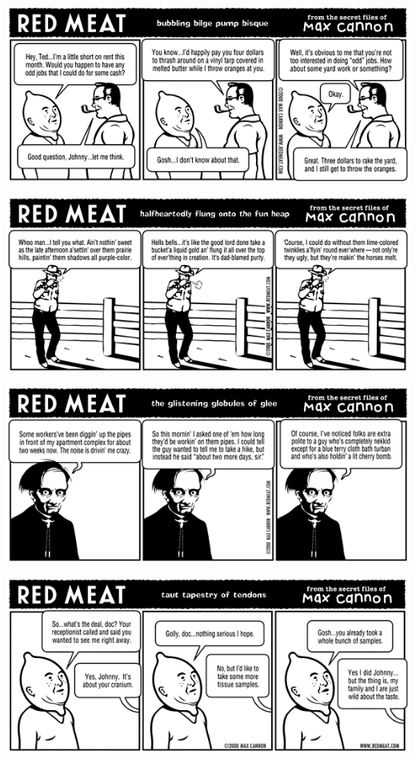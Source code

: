 \documentclass[a4paper,twoside,11pt]{article}
\begin{document}
\includegraphics[width=\textwidth]{redmeat_2000-03-14.png}



\includegraphics[width=\textwidth]{redmeat_2000-03-21.png}



\includegraphics[width=\textwidth]{redmeat_2000-03-28.png}



\includegraphics[width=\textwidth]{redmeat_2000-04-04.png}
\end{document}
